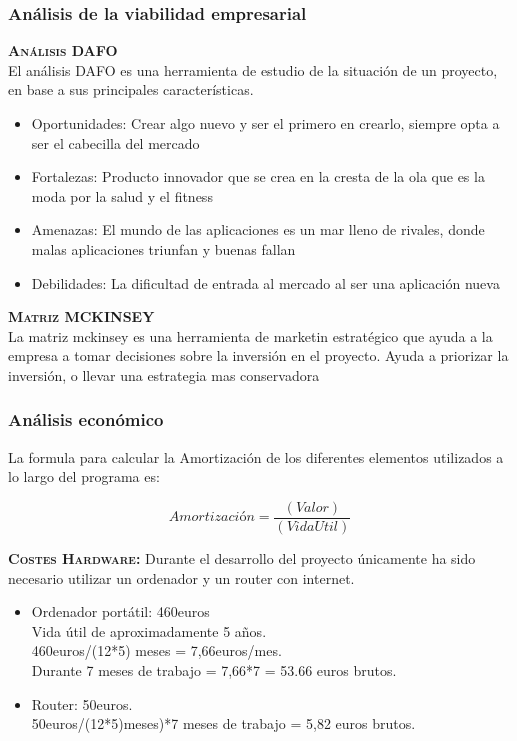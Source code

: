 \subsubsection{Análisis de la viabilidad empresarial}
\textbf{\textsc{Análisis DAFO}}\\
El análisis DAFO \cite{DAFO} es una herramienta de estudio de la situación de un proyecto, en base a sus principales características.
\begin{itemize}
\item Oportunidades: Crear algo nuevo y ser el primero en crearlo, siempre opta a ser el cabecilla del mercado
\item Fortalezas: Producto innovador que se crea en la cresta de la ola que es la moda por la salud y el fitness
\item Amenazas: El mundo de las aplicaciones es un mar lleno de rivales, donde malas aplicaciones triunfan y buenas fallan
\item Debilidades: La dificultad de entrada al mercado al ser una aplicación nueva	
\end{itemize}
\textbf{\textsc{Matriz MCKINSEY}}\\
La matriz mckinsey \cite{matriz} es una herramienta de marketin estratégico que ayuda a la empresa a tomar decisiones sobre la inversión en el proyecto. Ayuda a priorizar la inversión, o llevar una estrategia mas conservadora
\subsubsection{Análisis económico}
La formula para calcular la Amortización de los diferentes elementos utilizados a lo largo del programa es:

\begin{equation}
Amortización = \frac{(Valor)}{(VidaUtil)}
\end{equation}

\textbf{\textsc{Costes Hardware:}}
Durante el desarrollo del proyecto únicamente ha sido necesario utilizar un ordenador y un router con internet.
\begin{itemize}
\item Ordenador portátil: 460euros \\Vida útil de aproximadamente 5 años.\\460euros/(12*5) meses = 7,66euros/mes.\\Durante 7 meses de trabajo = 7,66*7 = 53.66 euros brutos.
\item Router: 50euros. \\ 50euros/(12*5)meses)*7 meses de trabajo = 5,82 euros brutos.
\end{itemize}


